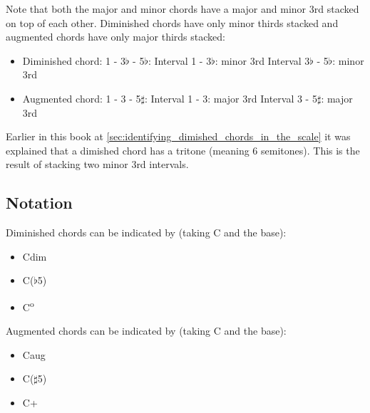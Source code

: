 Note that both the major and minor chords have a major and minor 3rd stacked on top of each other. Diminished chords have only minor thirds stacked and augmented chords have only major thirds stacked:

\begin{minipage}{0.5\textwidth}
	\begin{itemize}
		\item Diminished chord: 1 - 3$\flat$ - 5$\flat$:
			\subitem Interval 1 - 3$\flat$: minor 3rd
			\subitem Interval 3$\flat$ - 5$\flat$: minor 3rd
	\end{itemize}
\end{minipage}
\hfill
\begin{minipage}{0.5\textwidth}
	\begin{itemize}
		\item Augmented chord: 1 - 3 - 5$\sharp$:
			\subitem Interval 1 - 3: major 3rd
			\subitem Interval 3 - 5$\sharp$: major 3rd
	\end{itemize}
\end{minipage}

Earlier in this book at \autoref{sec:identifying_dimished_chords_in_the_scale} it was explained that a dimished chord has a tritone (meaning 6 semitones). This is the result of stacking two minor 3rd intervals.


\subsection{Notation}
\begin{minipage}{0.4\textwidth}
	Diminished chords can be indicated by (taking C and the base):
	
	\begin{itemize}
		\item Cdim
		\item C($\flat$5)
		\item C\textsuperscript{o}
	\end{itemize}
\end{minipage}
\hfill
\begin{minipage}{0.4\textwidth}
	Augmented chords can be indicated by (taking C and the base):
	
	\begin{itemize}
		\item Caug
		\item C($\sharp$5)
		\item C+
	\end{itemize}
\end{minipage}

